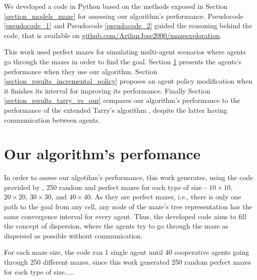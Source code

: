 \label{section_results}
We developed a code in Python based on the methods exposed in Section \ref{section_models_maze} for assessing our algorithm's performance. Pseudocode \ref{pseudocode_1} and Pseudocode \ref{pseudocode_2} guided the reasoning behind the code, that is available on \href{https://github.com/ArthurJose2000/mazeexploration}{github.com/ArthurJose2000/mazeexploration}.

This work used perfect mazes for simulating multi-agent scenarios where agents go through the mazes in order to find the goal. Section \ref{section_results_our_performance} presents the agents's performance when they use our algorithm. Section \ref{section_results_incremental_policy} proposes an agent policy modification when it finishes its interval for improving its performance. Finally Section \ref{section_results_tarry_vs_our} compares our algorithm's performance to the performance of the extended Tarry's algorithm \cite{KivelevitchCohen2010}, despite the latter having communication between agents.

\section{Our algorithm's perfomance}
\label{section_results_our_performance}

In order to assess our algotihm's performance, this work generates, using the code provided by , 250 random and perfect mazes for each type of size - $10 \times 10$, $20 \times 20$, $30 \times 30$, and $40 \times 40$. As they are perfect mazes, i.e., there is only one path to the goal from any cell, any node of the maze's tree representation has the same convergence interval for every agent. Thus, the developed code aims to fill the concept of dispersion, where the agents try to go through the maze as dispersed as possible without communication.

For each maze size, the code ran 1 single agent until 40 cooperative agents going through 250 different mazes, since this work generated 250 random perfect mazes for each type of size.....

